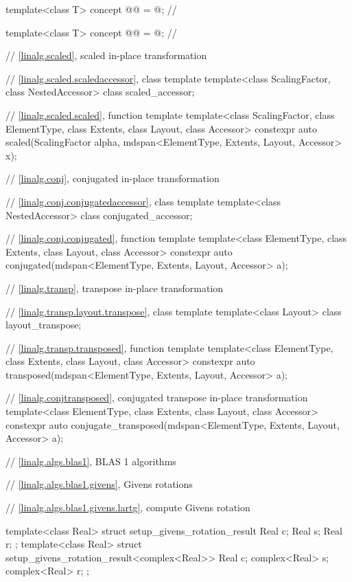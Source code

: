 \begin{codeblock}
{  template<class T>
    concept @@ = @\seebelow@;                   // \expos

  template<class T>
    concept @@ = @\seebelow@;                         // \expos

  // \ref{linalg.scaled}, scaled in-place transformation

  // \ref{linalg.scaled.scaledaccessor}, class template 
  template<class ScalingFactor, class NestedAccessor>
    class scaled_accessor;

  // \ref{linalg.scaled.scaled}, function template 
  template<class ScalingFactor,
           class ElementType, class Extents, class Layout, class Accessor>
    constexpr auto scaled(ScalingFactor alpha, mdspan<ElementType, Extents, Layout, Accessor> x);

  // \ref{linalg.conj}, conjugated in-place transformation

  // \ref{linalg.conj.conjugatedaccessor}, class template 
  template<class NestedAccessor>
    class conjugated_accessor;

  // \ref{linalg.conj.conjugated}, function template 
  template<class ElementType, class Extents, class Layout, class Accessor>
    constexpr auto conjugated(mdspan<ElementType, Extents, Layout, Accessor> a);

  // \ref{linalg.transp}, transpose in-place transformation

  // \ref{linalg.transp.layout.transpose}, class template 
  template<class Layout>
    class layout_transpose;

  // \ref{linalg.transp.transposed}, function template 
  template<class ElementType, class Extents, class Layout, class Accessor>
    constexpr auto transposed(mdspan<ElementType, Extents, Layout, Accessor> a);

  // \ref{linalg.conjtransposed}, conjugated transpose in-place transformation
  template<class ElementType, class Extents, class Layout, class Accessor>
    constexpr auto conjugate_transposed(mdspan<ElementType, Extents, Layout, Accessor> a);

  // \ref{linalg.algs.blas1}, BLAS 1 algorithms

  // \ref{linalg.algs.blas1.givens}, Givens rotations

  // \ref{linalg.algs.blas1.givens.lartg}, compute Givens rotation

  template<class Real>
    struct setup_givens_rotation_result {
      Real c;
      Real s;
      Real r;
    };
  template<class Real>
    struct setup_givens_rotation_result<complex<Real>> {
      Real c;
      complex<Real> s;
      complex<Real> r;
    };

}
\end{codeblock}
